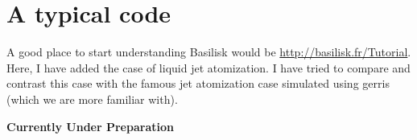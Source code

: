 \documentclass[]{article}
\newcommand\Colorhref[3][blue]{\href{#2}{\color{#1}#3}}
\begin{document}
\section{A typical code}
A good place to start understanding Basilisk would be \Colorhref{http://basilisk.fr/Tutorial}{http://basilisk.fr/Tutorial}. Here, I have added the case of liquid jet atomization. I have tried to compare and contrast this case with the famous jet atomization case simulated using gerris (which we are more familiar with).\\
\begin{center}
\textbf{\Huge Currently Under Preparation}
\end{center}
\end{document}
